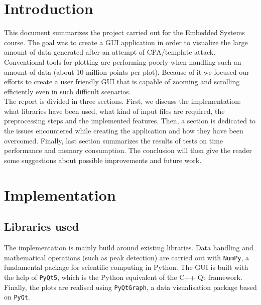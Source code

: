 \documentclass[11pt,a4paper]{article}
\begin{document}




\section{Introduction}
\label{sec:introduction}

This document summarizes the project carried out for the Embedded Systems course. The goal was to create a GUI application in order to visualize the large amount of data generated after an attempt of CPA/template attack. Conventional tools for plotting are performing poorly when handling such an amount of data (about 10 million points per plot). Because of it we focused our efforts to create a user friendly GUI that is capable of zooming and scrolling efficiently even in such difficult scenarios.\\

The report is divided in three sections. First, we discuss the implementation: what libraries have been used, what kind of input files are required, the preprocessing steps and the implemented features. Then, a section is dedicated to the issues encountered while creating the application and how they have been overcomed. Finally, last section summarizes the results of tests on time performance and memory consumption. The conclusion will then give the reader some suggestions about possible improvements and future work.



\section{Implementation}
\label{sec:implementation}

\subsection{Libraries used}
The implementation is mainly build around existing libraries. Data handling and mathematical operations (such as peak detection) are carried out with \texttt{NumPy}, a fundamental package for scientific computing in Python. The GUI is built with the help of \texttt{PyQt5}, which is the Python equivalent of the C++ Qt framework. Finally, the plots are realised using \texttt{PyQtGraph}, a data visualisation package based on \texttt{PyQt}. 
\end{document}
